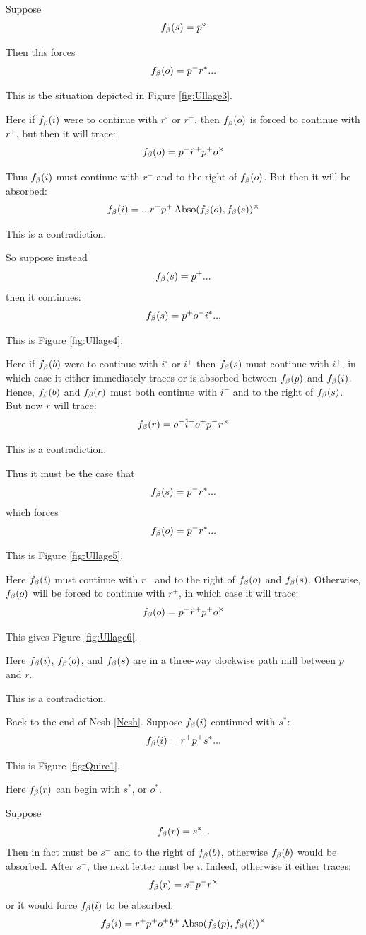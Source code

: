 Suppose
$$f_\beta(s) = p^\circ$$

Then this forces
$$f_\beta(o) = p^- r^*...$$

This is the situation depicted in Figure \ref{fig:Ullage3}. 

Here if $f_\beta(i)$ were to continue with $r^\circ$ or $r^+$, then $f_\beta(o)$ is forced to continue with $r^+$, but then it will trace:
$$f_\beta(o) = p^- \hat{r}^+ p^+ o^\times$$

Thus $f_\beta(i)$ must continue with $r^-$ and to the right of $f_\beta(o)$. But then it will be absorbed:
$$f_\beta(i) = ...r^- p^+ \operatorname{Abso}(f_\beta(o), f_\beta(s))^\times$$

This is a contradiction.

So suppose instead
$$f_\beta(s) = p^+...$$
then it continues:
$$f_\beta(s) = p^+ o^- i^*...$$

This is Figure \ref{fig:Ullage4}.

Here if $f_\beta(b)$ were to continue with $i^\circ$ or $i^+$ then $f_\beta(s)$ must continue with $i^+$, in which case it either immediately traces or is absorbed between $f_\beta(p)$ and $f_\beta(i)$. Hence, $f_\beta(b)$ and $f_\beta(r)$ must both continue with $i^-$ and to the right of $f_\beta(s)$. But now $r$ will trace:
$$f_\beta(r) = o^- \hat{i}^- o^+ p^- r^\times$$

This is a contradiction.

Thus it must be the case that
$$f_\beta(s) = p^- r^*...$$
which forces
$$f_\beta(o) = p^- r^*...$$

This is Figure \ref{fig:Ullage5}. 

Here $f_\beta(i)$ must continue with $r^-$ and to the right of $f_\beta(o)$ and $f_\beta(s)$. Otherwise, $f_\beta(o)$ will be forced to continue with $r^+$, in which case it will trace:
$$f_\beta(o) = p^- \hat{r}^+ p^+ o^\times$$

This gives Figure \ref{fig:Ullage6}.

Here $f_\beta(i)$, $f_\beta(o)$, and $f_\beta(s)$ are in a three-way clockwise path mill between $p$ and $r$.

This is a contradiction.


\label{Quire}
Back to the end of Nesh \ref{Nesh}. Suppose $f_\beta(i)$ continued with $s^*$:
$$f_\beta(i) = r^+ p^+ s^*...$$

This is Figure \ref{fig:Quire1}.

Here $f_\beta(r)$ can begin with $s^*$, or $o^*$. 

\label{Yepsen}
Suppose 
$$f_\beta(r) = s^*...$$
Then in fact must be $s^-$ and to the right of $f_\beta(b)$, otherwise $f_\beta(b)$ would be absorbed. After $s^-$, the next letter must be $i$. Indeed, otherwise it either traces:
$$f_\beta(r) = s^- p^- r^\times$$
or it would force $f_\beta(i)$ to be absorbed:
$$f_\beta(i) = r^+ p^+ o^+ b^+ \operatorname{Abso}(f_\beta(p), f_\beta(i))^\times$$

